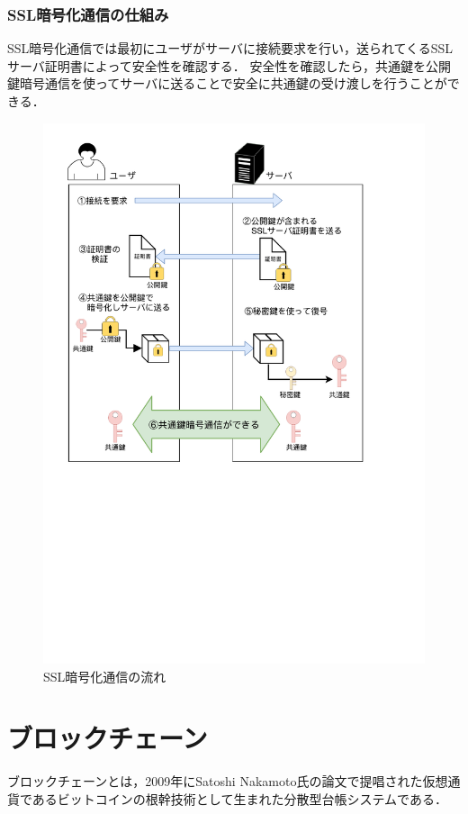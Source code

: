 \documentclass[a4j,12pt]{jsarticle}
\begin{document}
\subsubsection{SSL暗号化通信の仕組み}

SSL暗号化通信では最初にユーザがサーバに接続要求を行い，送られてくるSSLサーバ証明書によって安全性を確認する．
安全性を確認したら，共通鍵を公開鍵暗号通信を使ってサーバに送ることで安全に共通鍵の受け渡しを行うことができる．




\begin{figure}[H]
\centering
\includegraphics[mediaboxonly=/CropBox,width=14cm]{SSL.pdf}
\caption{SSL暗号化通信の流れ}
\label{fig:no}
\end{figure} 



\newpage
\section{ブロックチェーン}
ブロックチェーンとは，2009年にSatoshi Nakamoto氏の論文\cite{satoshi}で提唱された仮想通貨であるビットコインの根幹技術として生まれた分散型台帳システムである．
\end{document}
